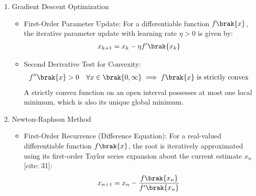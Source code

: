 \begin{enumerate}[label=\thesubsection.\arabic*, ref=\thesubsection.\theenumi]
\item Gradient Descent Optimization
\begin{itemize}
\item First-Order Parameter Update:
For a differentiable function $f\brak{x}$, the iterative parameter update with learning rate $\eta > 0$ is given by:
\begin{align}
x_{k+1} = x_k - \eta f'\brak{x_k} \label{eq:grad_descent_update}
\end{align}
\item Second Derivative Test for Convexity:
\begin{align}
f''\brak{x} > 0 \quad \forall x \in \brak{0, \infty} \implies f\brak{x} \text{ is strictly convex} \label{eq:convexity_check}
\end{align}
A strictly convex function on an open interval possesses at most one local minimum, which is also its unique global minimum.
\end{itemize}

\item Newton-Raphson Method
\begin{itemize}
\item First-Order Recurrence (Difference Equation):
For a real-valued differentiable function $f\brak{x}$, the root is iteratively approximated using its first-order Taylor series expansion about the current estimate $x_n$[cite: 31]:
\begin{align}
x_{n+1} = x_n - \frac{f\brak{x_n}}{f'\brak{x_n}} \label{eq:newton_raphson}
\end{align}
\end{itemize}


\end{enumerate}

